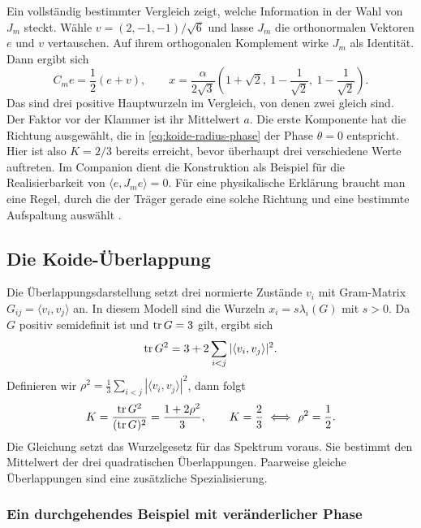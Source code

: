 Ein vollständig bestimmter Vergleich zeigt, welche Information in
der Wahl von \(J_m\) steckt. Wähle
\(v=(2,-1,-1)/\sqrt6\) und lasse \(J_m\) die orthonormalen
Vektoren \(e\) und \(v\) vertauschen. Auf ihrem orthogonalen
Komplement wirke \(J_m\) als Identität. Dann ergibt sich
\[
 C_m e=\frac12(e+v),\qquad
 x=\frac{\alpha}{2\sqrt3}
       \left(1+\sqrt2,\ 1-\frac1{\sqrt2},\ 1-\frac1{\sqrt2}\right).
\]
Das sind drei positive Hauptwurzeln im Vergleich, von denen zwei
gleich sind. Der Faktor vor der Klammer ist ihr
Mittelwert \(a\). Die erste Komponente hat die Richtung ausgewählt,
die in \eqref{eq:koide-radius-phase} der Phase \(\theta=0\)
entspricht. Hier ist also \(K=2/3\) bereits erreicht, bevor überhaupt
drei verschiedene Werte auftreten. Im Companion dient die
Konstruktion als Beispiel für die Realisierbarkeit von
\(\langle e,J_m e\rangle=0\). Für eine physikalische Erklärung
braucht man eine Regel, durch die der Träger gerade eine solche
Richtung und eine bestimmte Aufspaltung auswählt \cite{companion,physics}.

\subsection{Die Koide-Überlappung}

Die Überlappungsdarstellung setzt drei normierte Zustände \(v_i\) mit Gram-Matrix \(G_{ij}=\langle v_i,v_j\rangle\) an. In diesem Modell sind die Wurzeln \(x_i=s\lambda_i(G)\) mit \(s>0\). Da \(G\) positiv semidefinit ist und \(\operatorname{tr} G=3\) gilt, ergibt sich
\[
 \operatorname{tr} G^2=3+2\sum_{i<j}|\langle v_i,v_j\rangle|^2.
\]
Definieren wir \(\rho^2=\frac13\sum_{i<j}|\langle v_i,v_j\rangle|^2\), dann folgt
\begin{equation}
 K=\frac{\operatorname{tr} G^2}{(\operatorname{tr} G)^2}
   =\frac{1+2\rho^2}{3},
 \qquad K=\frac23\ \Longleftrightarrow\ \rho^2=\frac12 .
 \label{eq:overlap}
\end{equation}
Die Gleichung setzt das Wurzelgesetz für das Spektrum voraus. Sie bestimmt den Mittelwert der drei quadratischen Überlappungen. Paarweise gleiche Überlappungen sind eine zusätzliche Spezialisierung.


\subsubsection{Ein durchgehendes Beispiel mit veränderlicher Phase}

